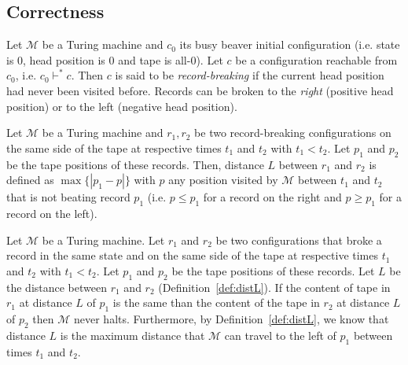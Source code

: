\subsection{Correctness}

\begin{definition}\normalfont
  Let $\mathcal{M}$ be a Turing machine and $c_0$ its busy beaver initial configuration (i.e. state is 0, head position is 0 and tape is all-0).
  Let $c$ be a configuration reachable from $c_0$, i.e. $c_0 \vdash^* c$.
Then $c$ is said to be \textit{record-breaking} if the current head position had never been visited before. Records can be broken to the \textit{right} (positive head position) or to the left (negative head position).
\end{definition}

\begin{definition}\label{def:distL}\normalfont
  Let $\mathcal{M}$ be a Turing machine and $r_1,r_2$ be two record-breaking configurations on the same side of the tape at respective times $t_1$ and $t_2$ with $t_1 < t_2$. Let $p_1$ and $p_2$ be the tape positions of these records. Then, distance $L$ between $r_1$ and $r_2$ is defined as $\max\{|p_1 - p|\}$ with $p$ any position visited by $\mathcal{M}$ between $t_1$ and $t_2$ that is not beating record $p_1$ (i.e. $p \leq p_1$ for a record on the right and $p \geq p_1$ for a record on the left). 
\end{definition}

\begin{lemma}\label{lem:translated-cyclers}\normalfont 
Let $\mathcal{M}$ be a Turing machine. Let $r_1$ and $r_2$ be two configurations that broke a record in the same state and on the same side of the tape at respective times $t_1$ and $t_2$ with $t_1 < t_2$. Let $p_1$ and $p_2$ be the tape positions of these records. Let $L$ be the distance between $r_1$ and $r_2$ (Definition~\ref{def:distL}). If the content of tape in $r_1$ at distance $L$ of $p_1$ is the same than the content of the tape in $r_2$ at distance $L$ of $p_2$ then $\mathcal{M}$ never halts. Furthermore, by Definition~\ref{def:distL}, we know that distance $L$ is the maximum distance that $\mathcal{M}$ can travel to the left of $p_1$ between times $t_1$ and $t_2$.
\end{lemma}


